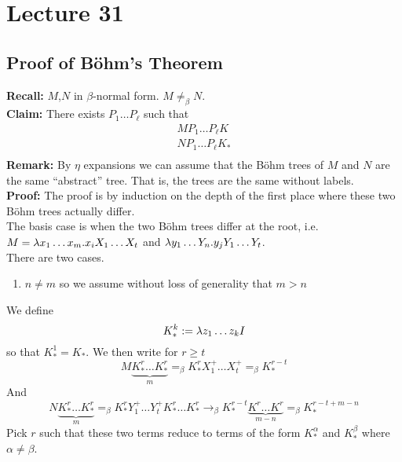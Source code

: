 \chapter{Lecture 31}
\pagestyle{fancy}

\section{Proof of B\"ohm's Theorem}
\textbf{Recall:} $M$,$N$ in $\beta$-normal form. $M \not=_\beta N$.\\

\textbf{Claim:} There exists $P_1\ldots P_\ell$ such that
\begin{eqnarray*}
  MP_1\ldots P_\ell K\\
  NP_1\ldots P_\ell K_*\\
\end{eqnarray*}
\textbf{Remark:} By $\eta$ expansions we can assume that the B\"ohm trees of $M$ and $N$ are the same ``abstract'' tree. That is, the trees are the same without labels.\\

\textbf{Proof:} The proof is by induction on the depth of the first place where these two B\"ohm trees actually differ.\\

The basis case is when the two B\"ohm trees differ at the root, i.e. $M = \lambda x_1\ldots x_m.x_iX_1\ldots X_t$ and $\lambda y_1 \ldots Y_n . y_j Y_1\ldots Y_t$.\\

There are two cases.
\begin{enumerate}[(1)]
  \item $n \not= m$ so we assume without loss of generality that $m > n$
\end{enumerate}
We define
\begin{equation*}
  K_*^k := \lambda z_1\ldots z_k I
\end{equation*}
so that $K_*^1 = K_*$.
We then write for $r \geq t$
\begin{equation*}
  M\underbrace{K_*^{r}\ldots K_*^{r}}_{m} =_\beta K_*^{r}X_1^+\ldots X_t^+ =_\beta K_*^{r-t}
\end{equation*}
And
\begin{equation*}
  N\underbrace{K_*^{r}\ldots K_*^{r}}_{m} =_\beta K_*^{r}Y_1^+ \ldots Y_t^+ K_*^{r} \ldots K_*^{r} \rightarrow_\beta K_*^{r-t}\underbrace{K^r\ldots K^r}_{m - n} =_\beta K_*^{r-t+m-n}
\end{equation*}
Pick $r$ such that these two terms reduce to terms of the form $K_*^\alpha$ and $K_*^\beta$ where $\alpha \not= \beta$.\\

